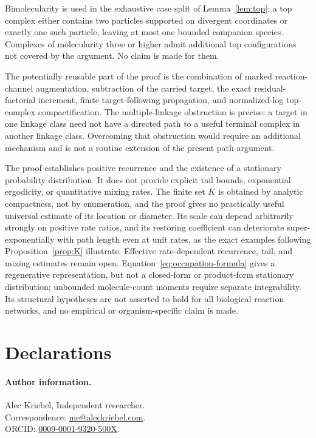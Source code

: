 Bimolecularity is used in the exhaustive case split of
Lemma~\ref{lem:top}: a top complex either contains two particles supported on
divergent coordinates or exactly one such particle, leaving at most one
bounded companion species.  Complexes of molecularity three or higher admit
additional top configurations not covered by the argument.  No claim is made
for them.

The potentially reusable part of the proof is the combination of marked
reaction-channel augmentation, subtraction of the carried target, the exact
residual-factorial increment, finite target-following propagation, and
normalized-log top-complex compactification.  The multiple-linkage obstruction
is precise: a target in one linkage class need not have a directed path to a
useful terminal complex in another linkage class.  Overcoming that obstruction
would require an additional mechanism and is not a routine extension of the
present path argument.

The proof establishes positive recurrence and the existence of a stationary
probability distribution.  It does not provide explicit tail bounds,
exponential ergodicity, or quantitative mixing rates.  The finite set
\(K\) is obtained by analytic compactness, not by enumeration, and the proof
gives no practically useful universal estimate of its location or diameter.
Its scale can depend arbitrarily strongly on positive rate ratios, and its
restoring coefficient can deteriorate super-exponentially with path length
even at unit rates, as the exact examples following
Proposition~\ref{prop:K} illustrate.  Effective
rate-dependent recurrence, tail, and mixing estimates remain open.
Equation~\eqref{eq:occupation-formula} gives a regenerative representation,
but not a closed-form or product-form stationary distribution; unbounded
molecule-count moments require separate integrability.  Its structural
hypotheses are not asserted to hold for all biological reaction networks, and
no empirical or organism-specific claim is made.

\section*{Declarations}

\paragraph{Author information.}
Alec Kriebel, Independent researcher.\\
Correspondence: \mbox{\href{mailto:me@aleckriebel.com}{me@aleckriebel.com}}.\\
ORCID: \href{https://orcid.org/0009-0001-9320-500X}{0009-0001-9320-500X}.


